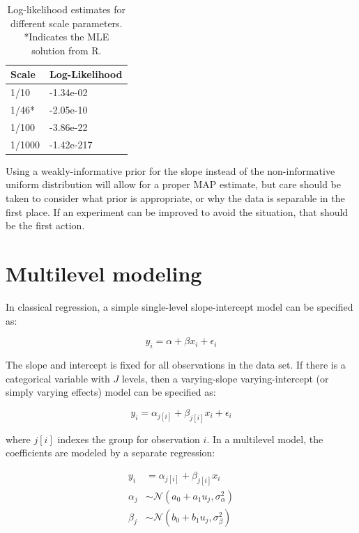 \documentclass[11pt, oneside, openany]{scrbook}
\begin{document}
\begin{table}[!h]

\caption{\label{tab:ch030-Quality-Surreal-Street}Log-likelihood estimates for different scale parameters. *Indicates the MLE solution from R.}
\centering
\begin{tabular}[t]{ll}
\toprule
Scale & Log-Likelihood\\
\midrule
1/10 & -1.34e-02\\
1/46* & -2.05e-10\\
1/100 & -3.86e-22\\
1/1000 & -1.42e-217\\
\bottomrule
\end{tabular}
\end{table}

Using a weakly-informative prior for the slope instead of the non-informative uniform distribution will allow for a proper MAP estimate, but care should be taken to consider what prior is appropriate, or why the data is separable in the first place. If an experiment can be improved to avoid the situation, that should be the first action.

\hypertarget{multilevel-modeling}{%
\section{Multilevel modeling}\label{multilevel-modeling}}

In classical regression, a simple single-level slope-intercept model can be specified as:

\begin{equation}
y_i = \alpha + \beta x_i + \epsilon_i
\label{eq:single-level-fixed}
\end{equation}

The slope and intercept is fixed for all observations in the data set. If there is a categorical variable with \(J\) levels, then a varying-slope varying-intercept (or simply varying effects) model can be specified as:

\begin{equation}
y_i = \alpha_{j[i]} + \beta_{j[i]} x_i + \epsilon_i
\label{eq:single-level-fixed-varying}
\end{equation}

where \(j[i]\) indexes the group for observation \(i\). In a multilevel model, the coefficients are modeled by a separate regression:


\begin{equation}
\begin{split}
y_i &= \alpha_{j[i]} + \beta_{j[i]} x_i \\
\alpha_j &\sim \mathcal{N}(a_0 + a_1 u_j, \sigma_{\alpha}^2) \\
\beta_j &\sim \mathcal{N}(b_0 + b_1 u_j, \sigma_{\beta}^2) \\
\end{split}
\label{eq:multilevel-varying}
\end{equation}
\end{document}
